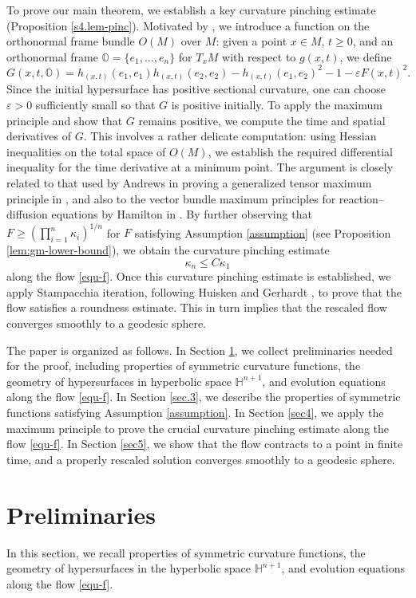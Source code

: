 \documentclass[11pt,reqno]{amsart}
\theoremstyle{remark}
\numberwithin{equation}{section}
\begin{document}
To prove our main theorem, we establish a key curvature pinching estimate (Proposition \ref{s4.lem-pinc}). Motivated by \cite{ACW21}, we introduce a function on the orthonormal frame bundle $O(M)$ over $M$: given a point $x\in M$, $t\geq 0$, and an orthonormal frame $\mathbb{O}=\{e_1,\dots,e_n\}$ for $T_x M$ with respect to $g(x,t)$, we define
\begin{equation*}
	G(x,t,\mathbb{O}) = h_{(x,t)}(e_1,e_1)h_{(x,t)}(e_2,e_2) - h_{(x,t)}(e_1,e_2)^2 - 1 - \varepsilon F(x,t)^2.
\end{equation*}
Since the initial hypersurface has positive sectional curvature, one can choose $\varepsilon>0$ sufficiently small so that $G$ is positive initially. To apply the maximum principle and show that $G$ remains positive, we compute the time and spatial derivatives of $G$. This involves a rather delicate computation: using Hessian inequalities on the total space of $O(M)$, we establish the required differential inequality for the time derivative at a minimum point. The argument is closely related to that used by Andrews in proving a generalized tensor maximum principle in \cite{And07}, and also to the vector bundle maximum principles for reaction–diffusion equations by Hamilton in \cite{Ha86}. By further observing that $F\geq \left(\prod_{i=1}^n \kappa_i\right)^{1/n}$ for $F$ satisfying Assumption \ref{assumption} (see Proposition \ref{lem:gm-lower-bound}), we obtain the curvature pinching estimate 
\[\kappa_n\leq C\kappa_1\] 
along the flow \eqref{equ-f}. Once this curvature pinching estimate is established, we apply Stampacchia iteration, following Huisken \cite{Hui86} and Gerhardt \cite{Ger15}, to prove that the  flow satisfies a roundness estimate. This in turn implies that the rescaled flow converges smoothly to a geodesic sphere.

The paper is organized as follows. In Section \ref{sec2}, we collect preliminaries needed for the proof, including properties of symmetric curvature functions, the geometry of hypersurfaces in hyperbolic space $\mathbb{H}^{n+1}$, and evolution equations along the flow \eqref{equ-f}. In Section \ref{sec.3},  we describe the properties of symmetric functions satisfying Assumption \ref{assumption}.  In Section \ref{sec4}, we apply the maximum principle to prove the crucial curvature pinching estimate along the flow \eqref{equ-f}. In Section \ref{sec5}, we show that the flow contracts to a point in finite time, and a properly rescaled solution converges smoothly to a geodesic sphere.


\section{Preliminaries}
\label{sec2}
In this section, we recall properties of symmetric curvature functions, the geometry of hypersurfaces in the hyperbolic space $\mathbb{H}^{n+1}$, and evolution equations along the flow \eqref{equ-f}.
\end{document}

